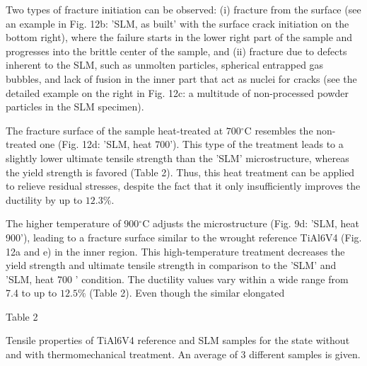 \documentclass[10pt]{article}
\begin{document}
Two types of fracture initiation can be observed: (i) fracture from the surface (see an example in Fig. 12b: 'SLM, as built' with the surface crack initiation on the bottom right), where the failure starts in the lower right part of the sample and progresses into the brittle center of the sample, and (ii) fracture due to defects inherent to the SLM, such as unmolten particles, spherical entrapped gas bubbles, and lack of fusion in the inner part that act as nuclei for cracks (see the detailed example on the right in Fig. 12c: a multitude of non-processed powder particles in the SLM specimen).

The fracture surface of the sample heat-treated at $700{ }^{\circ} \mathrm{C}$ resembles the non-treated one (Fig. 12d: 'SLM, heat 700'). This type of the treatment leads to a slightly lower ultimate tensile strength than the 'SLM' microstructure, whereas the yield strength is favored (Table 2). Thus, this heat treatment can be applied to relieve residual stresses, despite the fact that it only insufficiently improves the ductility by up to $12.3 \%$.

The higher temperature of $900{ }^{\circ} \mathrm{C}$ adjusts the microstructure (Fig. 9d: 'SLM, heat 900'), leading to a fracture surface similar to the wrought reference TiAl6V4 (Fig. 12a and e) in the inner region. This high-temperature treatment decreases the yield strength and ultimate tensile strength in comparison to the 'SLM' and 'SLM, heat 700 ' condition. The ductility values vary within a wide range from 7.4 to up to $12.5 \%$ (Table 2). Even though the similar elongated

Table 2

Tensile properties of TiAl6V4 reference and SLM samples for the state without and with thermomechanical treatment. An average of 3 different samples is given.
\end{document}
